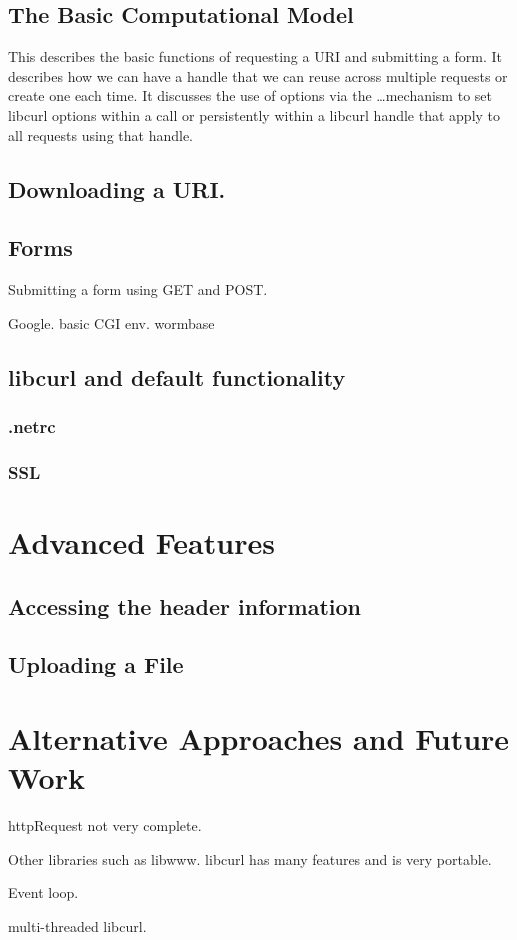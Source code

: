 \documentclass{article}
\begin{document}
\subsection{The Basic Computational Model}

This describes the basic functions of requesting a URI and submitting
a form.  It describes how we can have a handle that we can reuse
across multiple requests or create one each time.  It discusses the
use of options via the \ldots mechanism to set libcurl options within
a call or persistently within a libcurl handle that apply to all
requests using that handle.

\subsection{Downloading a URI.}



\subsection{Forms}
Submitting a form using GET and POST.

 Google.
 basic CGI env.
 wormbase


\subsection{libcurl and default functionality}
\subsubsection{.netrc}

\subsubsection{SSL}


\section{Advanced Features}\label{AdvancedFeatures}

\subsection{Accessing the header information}

\subsection{Uploading a File}

\section{Alternative Approaches and Future Work}

httpRequest
  not very complete.

Other libraries such as libwww.
  libcurl has many features and is very portable.

Event loop.
  
multi-threaded libcurl.
\end{document}
